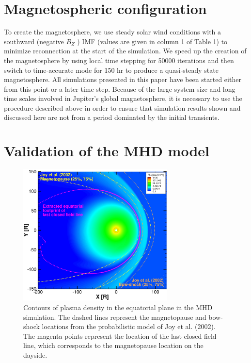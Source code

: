 \section{Magnetospheric configuration}
To create the magnetosphere, we use steady solar wind conditions with a southward (negative $B_Z$ ) IMF (values are given in column 1 of Table 1) to minimize reconnection at the start of the simulation. We speed up the creation of the magnetosphere by using local time stepping \cite{Toth2012a} for 50000 iterations and then switch to time‐accurate mode for 150 hr to produce a quasi‐steady state magnetosphere. All simulations presented in this paper have been started either from this point or a later time step. Because of the large system size and long time scales involved in Jupiter's global magnetosphere, it is necessary to use the procedure described above in order to ensure that simulation results shown and discussed here are not from a period dominated by the initial transients.


\section{Validation of the MHD model}

\begin{figure}
    \centering
    \includegraphics[width=0.7\textwidth]{images2/magnetopause-xy.jpg}
    \caption{Contours of plasma density in the equatorial plane in the MHD simulation. The dashed lines represent the magnetopause and bow-shock locations from the probabilistic model of Joy et al. (2002). The magenta points represent the location of the last closed field line, which corresponds to the magnetopause location on the dayside.}
    \label{fig:magnetopause-xy}
\end{figure}

